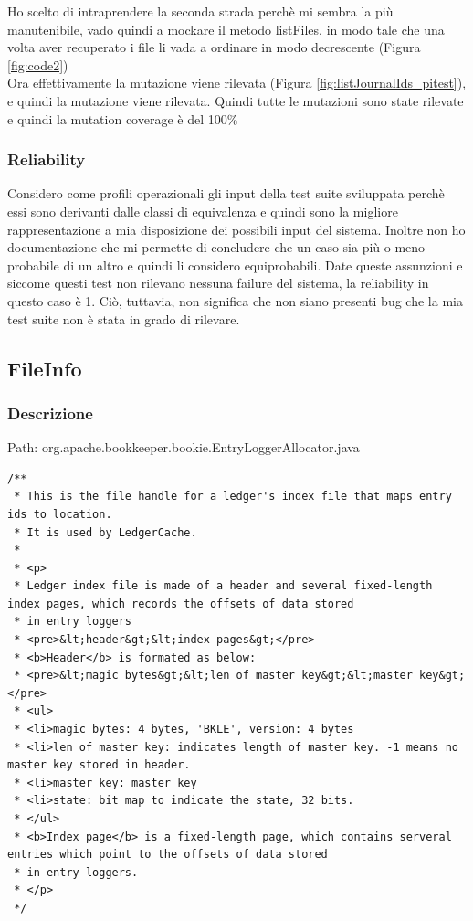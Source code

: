 \documentclass[12pt, a4paper]{article}
\begin{document}
Ho scelto di intraprendere la seconda strada perchè mi sembra la più manutenibile, vado quindi a mockare 
il metodo listFiles\(\), in modo tale che una volta aver recuperato i file li vada a 
ordinare in modo decrescente (Figura \ref{fig:code2}) \\

Ora effettivamente la mutazione viene rilevata (Figura \ref{fig:listJournalIds_pitest}), e quindi la mutazione viene rilevata.
Quindi tutte le mutazioni sono state rilevate e quindi la mutation coverage è del 100\% 

\subsubsection{Reliability}
Considero come profili operazionali gli input della test suite sviluppata perchè essi sono derivanti dalle classi di equivalenza
e quindi sono la migliore rappresentazione a mia disposizione dei possibili input del sistema. Inoltre non ho documentazione che
mi permette di concludere che un caso sia più o meno probabile di un altro e quindi li considero equiprobabili. Date queste 
assunzioni e siccome questi test non rilevano nessuna failure del sistema, la reliability in questo caso è 1. Ciò, tuttavia,
 non significa che non siano presenti bug che la mia test suite non è stata in grado di rilevare.

\subsection{FileInfo}
\subsubsection{Descrizione}
Path: org.apache.bookkeeper.bookie.EntryLoggerAllocator.java \\
\begin{verbatim}
/**
 * This is the file handle for a ledger's index file that maps entry ids to location.
 * It is used by LedgerCache.
 *
 * <p>
 * Ledger index file is made of a header and several fixed-length index pages, which records the offsets of data stored
 * in entry loggers
 * <pre>&lt;header&gt;&lt;index pages&gt;</pre>
 * <b>Header</b> is formated as below:
 * <pre>&lt;magic bytes&gt;&lt;len of master key&gt;&lt;master key&gt;</pre>
 * <ul>
 * <li>magic bytes: 4 bytes, 'BKLE', version: 4 bytes
 * <li>len of master key: indicates length of master key. -1 means no master key stored in header.
 * <li>master key: master key
 * <li>state: bit map to indicate the state, 32 bits.
 * </ul>
 * <b>Index page</b> is a fixed-length page, which contains serveral entries which point to the offsets of data stored
 * in entry loggers.
 * </p>
 */
\end{verbatim}
\end{document}
